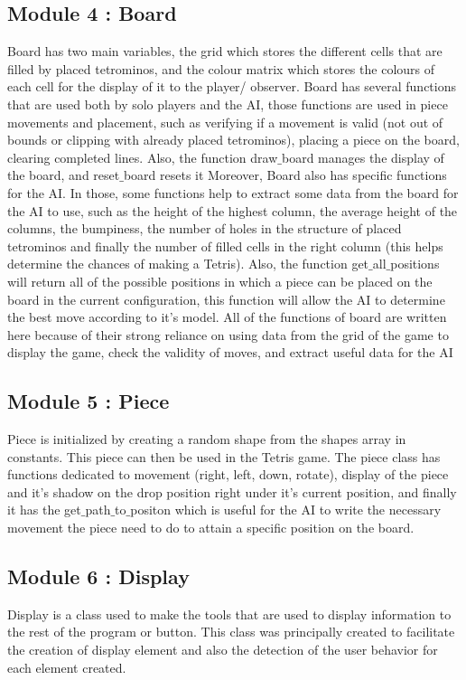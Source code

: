 \documentclass[conference]{IEEEtran}
\begin{document}
\subsection{Module 4 : Board}
Board has two main variables, the grid which stores the different cells that are filled by  placed tetrominos, and the colour matrix which stores the colours of each cell for the display of it to the player/ observer.
Board has several functions that are used both by solo players and the AI, those functions are used in piece movements and placement, such as verifying if a movement is valid (not out of bounds or clipping with already placed tetrominos), placing a piece on the board, clearing completed lines. Also, the function draw$\_$board manages the display of the board, and reset$\_$board resets it
Moreover, Board also has specific functions for the AI. In those, some functions help to extract some data from the board for the AI to use, such as  the height of the highest column, the average height of the columns, the bumpiness, the number of holes in the structure of placed tetrominos and finally the number of filled cells in the right column (this helps determine the chances of making a Tetris). Also, the function get$\_$all$\_$positions will return all of the possible positions in which a piece can be placed on the board in the current configuration, this function will allow the AI to determine the best move according to it's model.
All of the functions of board are written here because of their strong reliance on using data from the grid of the game to display the game, check the validity of moves, and extract useful data for the AI

\subsection{Module 5 : Piece}
Piece is initialized by creating a random shape from the shapes array in constants. This piece can then be used in the Tetris game. The piece class has functions dedicated to movement (right, left, down, rotate), display of the piece and it's shadow on the drop position right under it's current position, and finally it has the get$\_$path$\_$to$\_$positon which is useful for the AI to write the necessary movement the piece need to do to attain a specific position on the board.

\subsection{Module 6 : Display}
Display is a class used to make the tools that are used to display information to the rest of the program or button. This class was principally created to facilitate the creation of display element and also the detection of the user behavior for each element created. 
\end{document}

